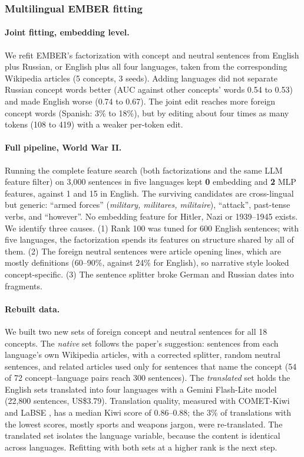 \documentclass[11pt]{article}
\begin{document}
\subsubsection{Multilingual EMBER fitting}
\label{sec:multi}

\paragraph{Joint fitting, embedding level.}
We refit EMBER's factorization with concept and neutral sentences from English plus Russian, or English plus all four languages, taken from the corresponding Wikipedia articles (5 concepts, 3 seeds).
Adding languages did not separate Russian concept words better (AUC against other concepts' words 0.54 to 0.53) and made English worse (0.74 to 0.67).
The joint edit reaches more foreign concept words (Spanish: 3\% to 18\%), but by editing about four times as many tokens (108 to 419) with a weaker per-token edit.

\paragraph{Full pipeline, World War II.}
Running the complete feature search (both factorizations and the same LLM feature filter) on 3{,}000 sentences in five languages kept \textbf{0} embedding and \textbf{2} MLP features, against 1 and 15 in English.
The surviving candidates are cross-lingual but generic: ``armed forces'' (\emph{military, militares, militaire}), ``attack'', past-tense verbs, and ``however''.
No embedding feature for Hitler, Nazi or 1939--1945 exists.
We identify three causes.
(1) Rank 100 was tuned for 600 English sentences; with five languages, the factorization spends its features on structure shared by all of them.
(2) The foreign neutral sentences were article opening lines, which are mostly definitions (60--90\%, against 24\% for English), so narrative style looked concept-specific.
(3) The sentence splitter broke German and Russian dates into fragments.

\paragraph{Rebuilt data.}
We built two new sets of foreign concept and neutral sentences for all 18 concepts.
The \emph{native} set follows the paper's suggestion: sentences from each language's own Wikipedia articles, with a corrected splitter, random neutral sentences, and related articles used only for sentences that name the concept (54 of 72 concept--language pairs reach 300 sentences).
The \emph{translated} set holds the English sets translated into four languages with a Gemini Flash-Lite model (22{,}800 sentences, US\$3.79).
Translation quality, measured with COMET-Kiwi \citep{rei2022cometkiwi} and LaBSE \citep{feng2022labse}, has a median Kiwi score of 0.86--0.88; the 3\% of translations with the lowest scores, mostly sports and weapons jargon, were re-translated.
The translated set isolates the language variable, because the content is identical across languages.
Refitting with both sets at a higher rank is the next step.
\end{document}
